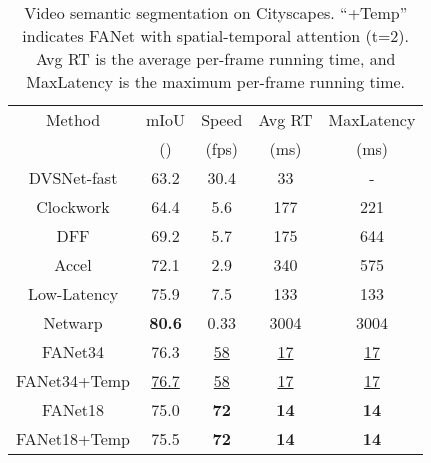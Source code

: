 \begin{table}[h]
\renewcommand\arraystretch{1.1}
\setlength{\tabcolsep}{6pt}
\begin{tabular}{ccccc}
\toprule
{Method} & {mIoU} & {Speed} & {Avg RT} & {MaxLatency}\\ 
& () & (fps) & (ms) & (ms) \\
 \midrule 
 {DVSNet-fast\cite{xu2018dynamic}}        &{63.2}              &{30.4}            &{33}              &- \\
 {Clockwork\cite{shelhamer2016clockwork}} &{64.4}              &{5.6}             &{177}             &{221} \\
 {DFF\cite{zhu17dff}}                     &{69.2}              &{5.7}             &{175}             &{644} \\
  {Accel\cite{jain2019accel}}  & 72.1 & 2.9 & 340 & 575 \\
{Low-Latency\cite{li2018low}}            &{75.9}              &{7.5}             &{133}             &{133}  \\
{Netwarp\cite{gadde2017semantic}}& \textbf{80.6} &0.33  & 3004 & 3004\\
 \midrule 
 {FANet34}                                   &{76.3}              &\underline{58}             &\underline{17}             &\underline{17} \\
 {FANet34+Temp}                     &{\underline{76.7}}     &{\underline{58}} &{\underline{17}} &{\underline{17}} \\
 \midrule 
 {FANet18}                                   &{75.0}              &\textbf{72}             &\textbf{14}             &\textbf{14}\\
 {FANet18+Temp}                     &{75.5}              &{\textbf{72}}    &{\textbf{14}}    &{\textbf{14}}\\
\bottomrule
\end{tabular}
\vspace{-0.1cm}
\caption{\small{Video semantic segmentation on Cityscapes. ``+Temp'' indicates FANet with spatial-temporal attention (t=2). Avg RT is the average per-frame running time, and MaxLatency is the maximum per-frame running time.}}
\label{tab:vid}
\vspace{-0.6cm}
\end{table}

